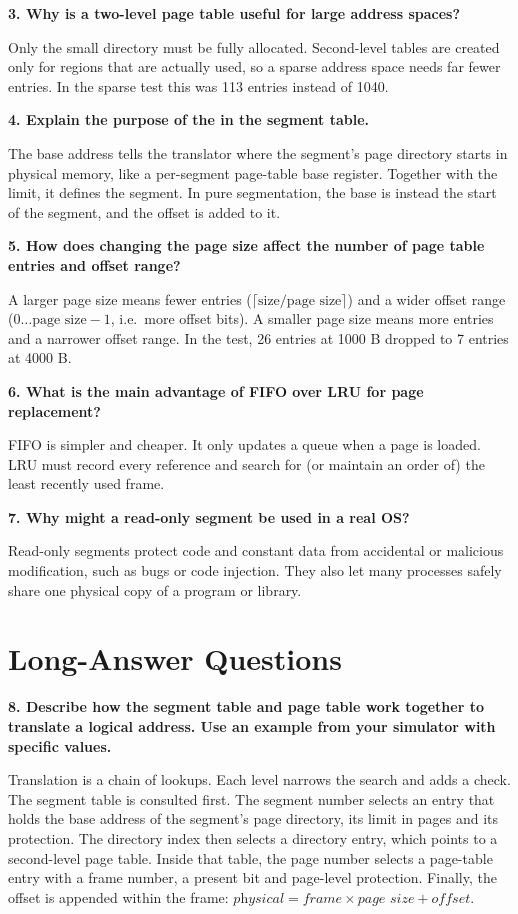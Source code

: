 \documentclass[11pt]{article}
\newcommand{\code}[1]{\texttt{\detokenize{#1}}}
\newcommand{\question}[1]{\par\medskip\noindent\textbf{#1}\par\smallskip}
\begin{document}
\question{3. Why is a two-level page table useful for large address spaces?}
Only the small directory must be fully allocated. Second-level tables are created only for
regions that are actually used, so a sparse address space needs far fewer entries. In the
sparse test this was 113 entries instead of 1040.

\question{4. Explain the purpose of the \code{base_address} in the segment table.}
The base address tells the translator where the segment's page directory starts in physical memory,
like a per-segment page-table base register. Together with the limit, it defines the segment. In pure
segmentation, the base is instead the start of the segment, and the offset is added to it.

\question{5. How does changing the page size affect the number of page table entries and offset range?}
A larger page size means fewer entries ($\lceil \text{size}/\text{page size}\rceil$) and a wider
offset range ($0 \ldots \text{page size}-1$, i.e.\ more offset bits). A smaller page size means more entries and a
narrower offset range. In the test, 26 entries at 1000 B dropped to 7 entries at 4000 B.

\question{6. What is the main advantage of FIFO over LRU for page replacement?}
FIFO is simpler and cheaper. It only updates a queue when a page is loaded. LRU must record every reference
and search for (or maintain an order of) the least recently used frame.

\question{7. Why might a read-only segment be used in a real OS?}
Read-only segments protect code and constant data from accidental or malicious modification,
such as bugs or code injection. They also let many processes safely share one physical copy of a program or
library.

\section{Long-Answer Questions}

\question{8. Describe how the segment table and page table work together to translate a logical address. Use an example from your simulator with specific values.}
Translation is a chain of lookups. Each level narrows the search and adds a check. The segment
table is consulted first. The segment number selects an entry that holds the base address of the
segment's page directory, its limit in pages and its protection. The directory index then selects a
directory entry, which points to a second-level page table. Inside that table, the page number selects a
page-table entry with a frame number, a present bit and page-level protection. Finally, the
offset is appended within the frame: $\textit{physical} = \textit{frame}\times\textit{page size} + \textit{offset}$.
\end{document}
